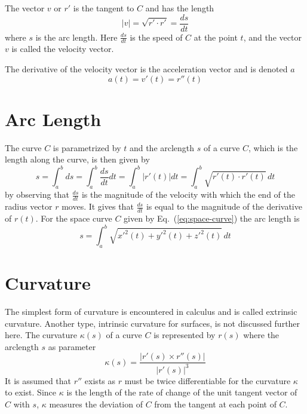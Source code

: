 The vector $v$ or $r'$ is the tangent to $C$ and has the length
\begin{equation}
  \label{eq:velocity}
  \lvert v\rvert = \sqrt{r' \cdot r'} = \frac{ds}{dt}
\end{equation}
where $s$ is the arc length. Here $\frac{ds}{dt}$ is the speed of $C$
at the point $t$, and the vector $v$ is called the velocity vector.



The derivative of the velocity vector is the acceleration vector and
is denoted $a$
\begin{equation}
  \label{eq:acceleration}
  a(t) = v'(t) = r''(t)
\end{equation}


\section{Arc Length}
\label{sec:arc-length}

The curve $C$ is parametrized by $t$ and the arclength $s$ of a curve
$C$, which is the length along the curve, is then given by
\begin{equation}
  \nonumber
  s = \int_a^b ds = \int_a^b \frac{ds}{dt}dt = \int_a^b \lvert r'(t)\rvert dt
    = \int_a^b \sqrt{r'(t)\cdot r'(t)} \,dt
\end{equation}
by observing that $\frac{ds}{dt}$ is the magnitude of the velocity
with which the end of the radius vector $r$ moves. It gives that
$\frac{ds}{dt}$ is equal to the magnitude of the derivative of $r(t)$.
For the space curve $C$ given by Eq.~(\ref{eq:space-curve}) the arc
length is
\begin{equation}
  \label{eq:arclength}
  s = \int_a^b \sqrt{{x'}^2(t)+{y'}^2(t)+{z'}^2(t)} \,dt
\end{equation}

\section{Curvature}
\label{sec:curvature}

The simplest form of curvature is encountered in calculus and is
called extrinsic curvature. Another type, intrinsic curvature for
surfaces, is not discussed further here. The curvature $\kappa (s)$ of a
curve $C$ is represented by $r(s)$ where the arclength $s$ as
parameter
\begin{equation}
  \label{curvature-s-parameter}
  \kappa (s) = \frac{\lvert r'(s) \times r''(s) \rvert}{\lvert r'(s) \rvert^3}
\end{equation}
It is assumed that $r''$ exists as $r$ must be twice differentiable
for the curvature $\kappa$ to exist.  Since $\kappa$ is the length of
the rate of change of the unit tangent vector of $C$ with $s$,
$\kappa$ measures the deviation of $C$ from the tangent at each point
of $C$.

